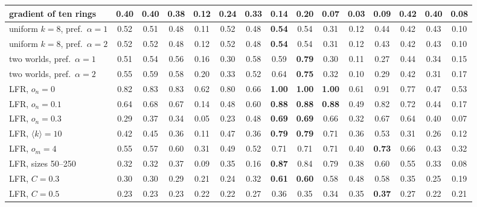 \begin{table}[t]
\begin{ruledtabular}
\begin{tabular}{lcccccccccccccc}
gradient of ten rings & 0.40 & 0.40 & 0.38 & 0.12 & 0.24 & 0.33 & 0.14 & 0.20 & 0.07 & 0.03 & 0.09 & \textbf{0.42} & 0.40 & 0.08 \\
\hline
uniform $k{=}8$, pref.\ $\alpha{=}1$ & 0.52 & 0.51 & 0.48 & 0.11 & 0.52 & 0.48 & \textbf{0.54} & 0.54 & 0.31 & 0.12 & 0.44 & 0.42 & 0.43 & 0.10 \\
uniform $k{=}8$, pref.\ $\alpha{=}2$ & 0.52 & 0.52 & 0.48 & 0.12 & 0.52 & 0.48 & \textbf{0.54} & 0.54 & 0.31 & 0.12 & 0.43 & 0.42 & 0.43 & 0.10 \\
two worlds, pref.\ $\alpha{=}1$ & 0.51 & 0.54 & 0.56 & 0.16 & 0.30 & 0.58 & 0.59 & \textbf{0.79} & 0.30 & 0.11 & 0.27 & 0.44 & 0.34 & 0.15 \\
two worlds, pref.\ $\alpha{=}2$ & 0.55 & 0.59 & 0.58 & 0.20 & 0.33 & 0.52 & 0.64 & \textbf{0.75} & 0.32 & 0.10 & 0.29 & 0.42 & 0.31 & 0.17 \\
\hline
LFR, $o_n{=}0$ & 0.82 & 0.83 & 0.83 & 0.62 & 0.80 & 0.66 & \textbf{1.00} & \textbf{1.00} & \textbf{1.00} & 0.61 & 0.91 & 0.77 & 0.47 & 0.53 \\
LFR, $o_n{=}0.1$ & 0.64 & 0.68 & 0.67 & 0.14 & 0.48 & 0.60 & \textbf{0.88} & \textbf{0.88} & \textbf{0.88} & 0.49 & 0.82 & 0.72 & 0.44 & 0.17 \\
LFR, $o_n{=}0.3$ & 0.29 & 0.37 & 0.34 & 0.05 & 0.23 & 0.48 & \textbf{0.69} & \textbf{0.69} & 0.66 & 0.32 & 0.67 & 0.64 & 0.40 & 0.07 \\
LFR, $\langle k\rangle{=}10$ & 0.42 & 0.45 & 0.36 & 0.11 & 0.47 & 0.36 & \textbf{0.79} & \textbf{0.79} & 0.71 & 0.36 & 0.53 & 0.31 & 0.26 & 0.12 \\
LFR, $o_m{=}4$ & 0.55 & 0.57 & 0.60 & 0.31 & 0.49 & 0.52 & 0.71 & 0.71 & 0.71 & 0.40 & \textbf{0.73} & 0.66 & 0.43 & 0.32 \\
LFR, sizes 50--250 & 0.32 & 0.32 & 0.37 & 0.09 & 0.35 & 0.16 & \textbf{0.87} & 0.84 & 0.79 & 0.38 & 0.60 & 0.55 & 0.33 & 0.08 \\
LFR, $C{=}0.3$ & 0.30 & 0.30 & 0.29 & 0.21 & 0.24 & 0.32 & \textbf{0.61} & \textbf{0.60} & 0.58 & 0.48 & 0.58 & 0.35 & 0.25 & 0.19 \\
LFR, $C{=}0.5$ & 0.23 & 0.23 & 0.23 & 0.22 & 0.22 & 0.27 & 0.36 & 0.35 & 0.34 & 0.35 & \textbf{0.37} & 0.27 & 0.22 & 0.21 \\
\end{tabular}
\end{ruledtabular}
\end{table}

